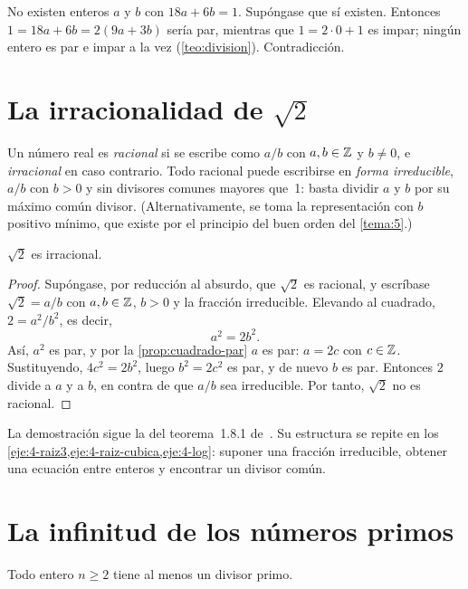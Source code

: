 \begin{ejemplo}\label{ej:no-solucion}
No existen enteros $a$ y $b$ con $18a+6b=1$. Supóngase que sí existen. Entonces $1=18a+6b=2(9a+3b)$ sería par, mientras que $1=2\cdot 0+1$ es impar; ningún entero es par e impar a la vez (\cref{teo:division}). Contradicción.
\end{ejemplo}

\section{La irracionalidad de \texorpdfstring{$\sqrt2$}{raíz de 2}}

Un número real es \emph{racional} si se escribe como $a/b$ con $a,b\in\mathbb{Z}$ y $b\neq 0$, e \emph{irracional} en caso contrario. Todo racional puede escribirse en \emph{forma irreducible}, $a/b$ con $b>0$ y sin divisores comunes mayores que~1: basta dividir $a$ y $b$ por su máximo común divisor. (Alternativamente, se toma la representación con $b$ positivo mínimo, que existe por el principio del buen orden del \cref{tema:5}.)

\begin{teorema}\label{teo:raiz2}
$\sqrt2$ es irracional.
\end{teorema}

\begin{proof}
Supóngase, por reducción al absurdo, que $\sqrt2$ es racional, y escríbase $\sqrt2=a/b$ con $a,b\in\mathbb{Z}$, $b>0$ y la fracción irreducible. Elevando al cuadrado, $2=a^{2}/b^{2}$, es decir,
\[
a^{2}=2b^{2}.
\]
Así, $a^{2}$ es par, y por la \cref{prop:cuadrado-par} $a$ es par: $a=2c$ con $c\in\mathbb{Z}$. Sustituyendo, $4c^{2}=2b^{2}$, luego $b^{2}=2c^{2}$ es par, y de nuevo $b$ es par. Entonces $2$ divide a $a$ y a $b$, en contra de que $a/b$ sea irreducible. Por tanto, $\sqrt2$ no es racional.
\end{proof}

La demostración sigue la del teorema~1.8.1 de~\cite{mcs}. Su estructura se repite en los \cref{eje:4-raiz3,eje:4-raiz-cubica,eje:4-log}: suponer una fracción irreducible, obtener una ecuación entre enteros y encontrar un divisor común.

\section{La infinitud de los números primos}

\begin{lema}\label{lem:divisor-primo}
Todo entero $n\ge 2$ tiene al menos un divisor primo.
\end{lema}

